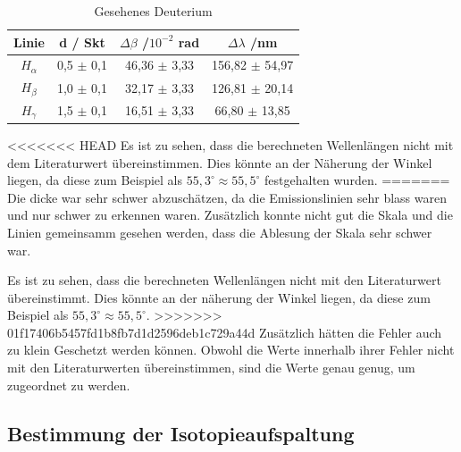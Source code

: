 \begin{table}[htbp]
    \centering
    \begin{tabular}{|c|c|c|c|}
        Linie & d / Skt & $\Delta \beta$ /$10^{-2}$ rad & $\Delta \lambda$ /nm \\
        \hline
        $H_\alpha$ & 0,5 $\pm$ 0,1 & 46,36 $\pm$ 3,33 & 156,82 $\pm$ 54,97 \\
        $H_\beta$ & 1,0 $\pm$ 0,1 & 32,17 $\pm$ 3,33 & 126,81 $\pm$ 20,14 \\
        $H_\gamma$ & 1,5 $\pm$ 0,1 & 16,51 $\pm$ 3,33 & 66,80 $\pm$ 13,85 \\


    \end{tabular}
    \caption{Gesehenes Deuterium}
    \label{tab: gesehenes deut}
\end{table}

<<<<<<< HEAD
Es ist zu sehen, dass die berechneten Wellenlängen nicht mit dem Literaturwert übereinstimmen. 
Dies könnte an der Näherung der Winkel liegen, da diese zum Beispiel als $55,3^\circ \approx 55,5^\circ$ festgehalten wurden.
=======
Die dicke war sehr schwer abzuschätzen, da die Emissionslinien sehr blass waren und nur schwer zu erkennen waren.
Zusätzlich konnte nicht gut die Skala und die Linien gemeinsamm gesehen werden, dass die Ablesung der Skala sehr schwer war.

Es ist zu sehen, dass die berechneten Wellenlängen nicht mit den Literaturwert übereinstimmt. 
Dies könnte an der näherung der Winkel liegen, da diese zum Beispiel als $55,3^\circ \approx 55,5^\circ$.
>>>>>>> 01f17406b5457fd1b8fb7d1d2596deb1c729a44d
Zusätzlich hätten die Fehler auch zu klein Geschetzt werden können.
Obwohl die Werte innerhalb ihrer Fehler nicht mit den Literaturwerten übereinstimmen, sind die Werte genau genug, um zugeordnet zu werden. 


\subsection{Bestimmung der Isotopieaufspaltung}

